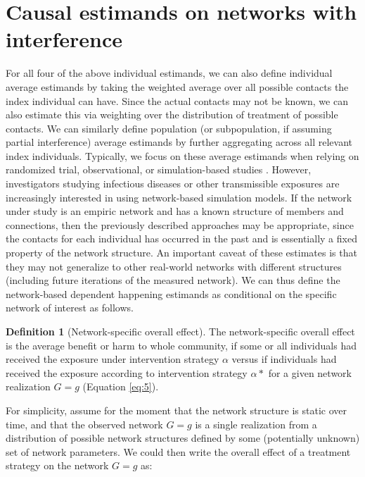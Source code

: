 \documentclass{article}
\theoremstyle{definition}
\newtheorem{definition}{Definition}[section]
\begin{document}
\section{Causal estimands on networks with interference}
For all four of the above individual estimands, we can also define individual average estimands by taking the weighted average over all possible contacts the index individual can have. Since the actual contacts may not be known, we can also estimate this via weighting over the distribution of treatment of possible contacts. We can similarly define population (or subpopulation, if assuming partial interference) average estimands by further aggregating across all relevant index individuals. Typically, we focus on these average estimands when relying on randomized trial, observational, or simulation-based studies \cite{halloran_dependent_2016, murray_emulating_2021, buchanan_disseminated_2021}.
However, investigators studying infectious diseases or other transmissible exposures are increasingly interested in using network-based simulation models. If the network under study is an empiric network and has a known structure of members and connections, then the previously described approaches may be appropriate, since the contacts for each individual has occurred in the past and is essentially a fixed property of the network structure. An important caveat of these estimates is that they may not generalize to other real-world networks with different structures (including future iterations of the measured network). We can thus define the network-based dependent happening estimands as conditional on the specific network of interest as follows. 

\begin{definition}[Network-specific overall effect] The network-specific overall effect is the average benefit or harm to whole community, if some or all individuals had received the exposure under intervention strategy $\alpha$ versus if individuals had received the exposure according to intervention strategy $\alpha*$ for a given network realization $G=g$ (Equation \ref{eq:5}).
\end{definition}

For simplicity, assume for the moment that the network structure is static over time, and that the observed network $G =g$ is a single realization from a distribution of possible network structures defined by some (potentially unknown) set of network parameters. We could then write the overall effect of a treatment strategy on the network $G=g$ as:
\end{document}
